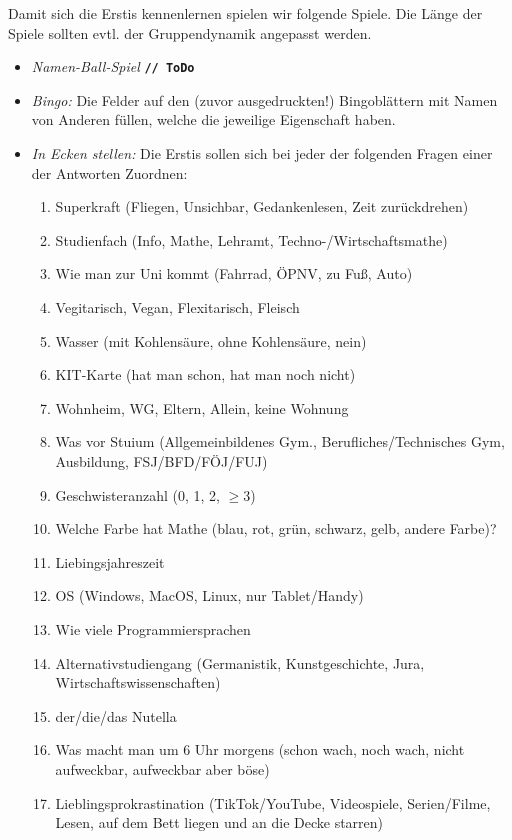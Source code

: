 \documentclass[10pt,twocolumn,ngerman]{scrartcl}
\begin{document}
Damit sich die Erstis kennenlernen spielen wir folgende Spiele. Die Länge der
Spiele sollten evtl. der Gruppendynamik angepasst werden.
\begin{itemize}
    \item \emph{Namen-Ball-Spiel} \textbf{\texttt{// ToDo}}
        
    \item \emph{Bingo:} Die Felder auf den (zuvor ausgedruckten!) Bingoblättern mit Namen von Anderen füllen, welche die jeweilige Eigenschaft haben.

    \item \emph{In Ecken stellen:} Die Erstis sollen sich bei jeder der
        folgenden Fragen einer der Antworten Zuordnen:
        \begin{enumerate}
            \item Superkraft (Fliegen, Unsichbar, Gedankenlesen, Zeit zurückdrehen)
            \item Studienfach (Info, Mathe, Lehramt, Techno-/Wirtschaftsmathe)
            \item Wie man zur Uni kommt (Fahrrad, ÖPNV, zu Fuß, Auto)
            \item Vegitarisch, Vegan, Flexitarisch, Fleisch
            \item Wasser (mit Kohlensäure, ohne Kohlensäure, nein)
            \item KIT-Karte (hat man schon, hat man noch nicht)
            \item Wohnheim, WG, Eltern, Allein, keine Wohnung
            \item Was vor Stuium (Allgemeinbildenes Gym., Berufliches/Technisches Gym, Ausbildung, FSJ/BFD/FÖJ/FUJ)
            \item Geschwisteranzahl (0, 1, 2, $\geq 3$)
            \item Welche Farbe hat Mathe (blau, rot, grün, schwarz, gelb, andere Farbe)?
            \item Liebingsjahreszeit
            \item OS (Windows, MacOS, Linux, nur Tablet/Handy)
            \item Wie viele Programmiersprachen
            \item Alternativstudiengang (Germanistik, Kunstgeschichte, Jura, Wirtschaftswissenschaften)
            \item der/die/das Nutella
            \item Was macht man um 6 Uhr morgens (schon wach, noch wach, nicht aufweckbar, aufweckbar aber böse)
            \item Lieblingsprokrastination (TikTok/YouTube, Videospiele, Serien/Filme, Lesen, auf dem Bett liegen und an die Decke starren)
        \end{enumerate}


\end{itemize}
\end{document}

